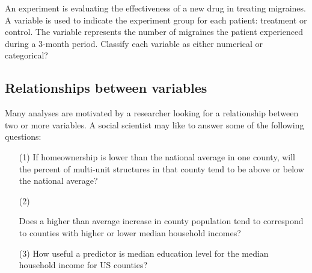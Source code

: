 \begin{exercisewrap}
\begin{nexercise}%
An experiment is evaluating the effectiveness of a new drug
in treating migraines.
A  variable is used to indicate the experiment group
for each patient: treatment or control.
The \mbox{} variable represents the number
of migraines the patient experienced during a 3-month period.
\mbox{Classify} each variable as either numerical or
categorical?\footnotemark
\end{nexercise}
\end{exercisewrap}

\subsection{Relationships between variables}
\label{variableRelations}

Many analyses are motivated by a researcher looking
for a relationship between two or more variables.
A social scientist may like to answer some of the
following questions:
\newcommand{\popchangevmedianhhincomequestion}[0]{
    Does a higher than average increase in county population
    tend to correspond to counties with higher or lower median
    household incomes?}%
\begin{enumerate}
\setlength{\itemsep}{0mm}
\item[(1)]\label{ownershipMultiUnitQuestion}
    If homeownership is lower than the national average
    in one county, will the percent of multi-unit structures
    in that county tend to be above or below the national average?
\item[(2)]\label{pop_change_v_median_hh_income_question}
    \popchangevmedianhhincomequestion{}
\item[(3)]\label{isAverageIncomeAssociatedWithSmokingBans}
    How useful a predictor is median education level
    for the median household income for US counties?
\end{enumerate}


